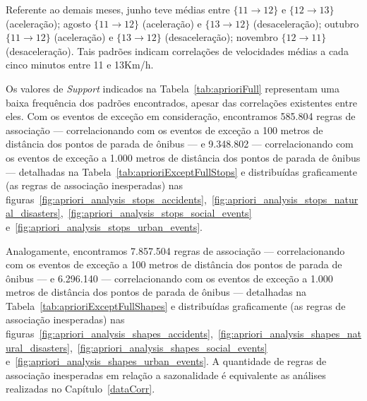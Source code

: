 \documentclass[
	12pt,				%
	oneside,			%
	a4paper,			%
	english,			%
	brazil				%
	]{abntex2ppgsi}
\begin{document}
{{{Referente ao demais meses, junho teve médias entre $\lbrace11 \rightarrow 12\rbrace$ e $\lbrace12 \rightarrow 13\rbrace$ (aceleração); agosto $\lbrace11 \rightarrow 12\rbrace$ (aceleração) e $\lbrace13 \rightarrow 12\rbrace$  (desaceleração); outubro $\lbrace11 \rightarrow 12\rbrace$ (aceleração) e $\lbrace13 \rightarrow 12\rbrace$ (desaceleração); novembro $\lbrace12 \rightarrow 11\rbrace$ (desaceleração). Tais padrões indicam correlações de velocidades médias a cada cinco minutos entre 11 e 13Km/h.

Os valores de \textit{Support} indicados na Tabela~\ref{tab:aprioriFull} representam uma baixa frequência dos padrões encontrados, apesar das correlações existentes entre eles. Com os eventos de exceção em consideração, encontramos 585.804 regras de associação --- correlacionando com os eventos de exceção a 100 metros de distância dos pontos de parada de ônibus --- e 9.348.802 --- correlacionando com os eventos de exceção a 1.000 metros de distância dos pontos de parada de ônibus --- detalhadas na Tabela~\ref{tab:aprioriExceptFullStops} e distribuídas graficamente (as regras de associação inesperadas) nas figuras~\ref{fig:apriori_analysis_stops_accidents},~\ref{fig:apriori_analysis_stops_natural_disasters},~\ref{fig:apriori_analysis_stops_social_events} e~\ref{fig:apriori_analysis_stops_urban_events}. 

Analogamente, encontramos 7.857.504 regras de associação --- correlacionando com os eventos de exceção a 100 metros de distância dos pontos de parada de ônibus --- e 6.296.140 --- correlacionando com os eventos de exceção a 1.000 metros de distância dos pontos de parada de ônibus --- detalhadas na Tabela~\ref{tab:aprioriExceptFullShapes} e distribuídas graficamente (as regras de associação inesperadas)  nas figuras~\ref{fig:apriori_analysis_shapes_accidents},~\ref{fig:apriori_analysis_shapes_natural_disasters},~\ref{fig:apriori_analysis_shapes_social_events} e~\ref{fig:apriori_analysis_shapes_urban_events}. A quantidade de regras de associação inesperadas em relação a sazonalidade é equivalente as análises realizadas no Capítulo~\ref{dataCorr}.

}}}
\end{document}
